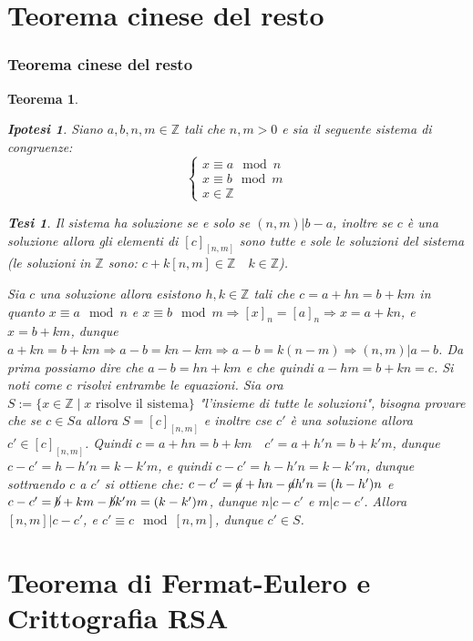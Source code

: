 \documentclass{article}
\makeatletter
\renewenvironment{proof}[1][\proofname]{\par
    \pushQED{\qed}%
    \normalfont \topsep6\p@\@plus6\p@\relax
    \trivlist
    \item\relax
    {\itshape
    #1\@addpunct{.}}\hspace\labelsep\ignorespaces
    }{%
    \popQED\endtrivlist\@endpefalse
}
\newtheorem{theorem}{Teorema}[part]
\newtheorem{ipothesis}[lemma]{Ipotesi}
\newtheorem{thesis}[lemma]{Tesi}
\newcommand{\Z}{\mathbb{Z}}
\makeatother
\begin{document}
\part{Teorema cinese del resto}
\section{Teorema cinese del resto}
\begin{theorem}
    \begin{ipothesis}
        Siano \(a,b,n,m\in\mathbb{Z}\) tali che \(n,m>0\) e sia il seguente sistema di congruenze:
        \[
            \begin{cases}
                x\equiv a\mod n\\
                x\equiv b\mod m\\
                x\in\mathbb{Z}
            \end{cases}
        \]
    \end{ipothesis}
    \begin{thesis}
        Il sistema ha soluzione se e solo se \((n,m)|b-a\), inoltre se \(c\) è una soluzione allora gli elementi di \([c]_{[n,m]}\) sono tutte e sole le soluzioni del sistema (le soluzioni in \(\mathbb{Z}\) sono: \( c+k[n,m]\in\Z\quad k\in\Z \)).
    \end{thesis}
    \begin{proof}
        Sia \(c\) una soluzione allora esistono \(h,k\in\Z\) tali che \(c=a+hn=b+km\) in quanto \(x\equiv a\mod n\) e \(x\equiv b\mod m\Rightarrow [x]_n=[a]_n\Rightarrow x=a+kn\), e \(x=b+km\), dunque \(a+kn=b+km\Rightarrow a-b=kn-km\Rightarrow a-b=k(n-m)\Rightarrow (n,m)|a-b\).
        Da prima possiamo dire che \(a-b = hn+km\) e che quindi \(a-hm=b+kn=c\). Si noti come \(c\) risolvi entrambe le equazioni.
        Sia ora \(S:=\{x\in\Z \mid x\text{ risolve il sistema}\}\) "l'insieme di tutte le soluzioni", bisogna provare che se \(c\in S\)a allora  \(S=[c]_{[n,m]}\) e inoltre cse \(c'\) è una soluzione allora \(c'\in[c]_{[n,m]}\).
        Quindi \(c=a+hn=b+km\quad c'=a+h'n=b+k'm\), dunque \(c-c'=h-h'n=k-k'm\), e quindi \(c-c'=h-h'n=k-k'm\), dunque sottraendo \(c\) a \(c'\) si ottiene che: \(c-c' = \cancel{a}+hn-\cancel{a}h'n=(h-h')n\) e \(c-c' = \cancel{b}+km-\cancel{b}k'm=(k-k')m\), dunque \(n|c-c'\) e \(m|c-c'\). Allora \([n,m] | c-c'\), e \(c'\equiv c\mod [n,m]\), dunque \(c'\in S\).
    \pushQED{}
    \end{proof}
    \raggedleft{{\ensuremath{\blacksquare}}}
\end{theorem}
\part{Teorema di Fermat-Eulero e Crittografia RSA}
\end{document}
